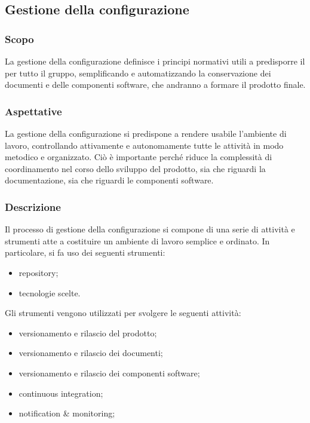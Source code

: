 \subsection{Gestione della configurazione}


\subsubsection{Scopo}

La gestione della configurazione definisce i principi normativi utili a predisporre il  per tutto il gruppo, semplificando e automatizzando la conservazione dei documenti e delle componenti software, che andranno a formare il prodotto finale.

\subsubsection{Aspettative}

La gestione della configurazione si predispone a rendere usabile l'ambiente di lavoro, controllando attivamente e autonomamente tutte le attività in modo metodico e organizzato. Ciò è importante perché riduce la complessità di coordinamento nel corso dello sviluppo del prodotto, sia che riguardi la documentazione, sia che riguardi le componenti software.

\subsubsection{Descrizione}

Il processo di gestione della configurazione si compone di una serie di attività e strumenti atte a costituire un ambiente di lavoro semplice e ordinato. 
In particolare, si fa uso dei seguenti strumenti:
\begin{itemize}
	\item repository;
	\item tecnologie scelte.
\end{itemize}
Gli strumenti vengono utilizzati per svolgere le seguenti attività:
\begin{itemize}
	\item versionamento e rilascio del prodotto;
	\item versionamento e rilascio dei documenti;
	\item versionamento e rilascio dei componenti software;
	\item continuous integration;
	\item notification \& monitoring;
\end{itemize}


